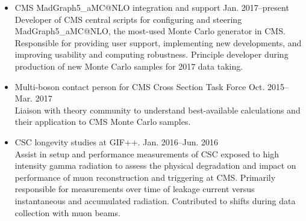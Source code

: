 \documentclass[10pt]{res} %
\begin{document}
\begin{resume}
\begin{itemize}
  \item CMS MadGraph5\_aMC@NLO integration and support \hfill{Jan. 2017--present} \\
    Developer of CMS central scripts
    for configuring and steering MadGraph5\_aMC@NLO, the most-used Monte Carlo generator in CMS. Responsible for 
    providing user support, implementing new developments, 
    and improving usability and computing robustness. Principle developer during production
    of new Monte Carlo samples for 2017 data taking.

  \item Multi-boson contact person for CMS Cross Section Task Force \hfill{Oct. 2015--Mar. 2017} \\
    Liaison with theory community to understand best-available calculations and 
    their application to CMS Monte Carlo samples. 

  \item CSC longevity studies at GIF++. \hfill{Jan. 2016--Jun. 2016} \\
    Assist in setup and performance measurements
    of CSC exposed to high intensity gamma radiation to assess the physical degradation and impact on performance
    of muon reconstruction and triggering at CMS. Primarily responsible for measurements over time of leakage current
    versus instantaneous and accumulated radiation. Contributed to shifts during data collection with muon beams.
\end{itemize}


\end{resume}
\end{document}
